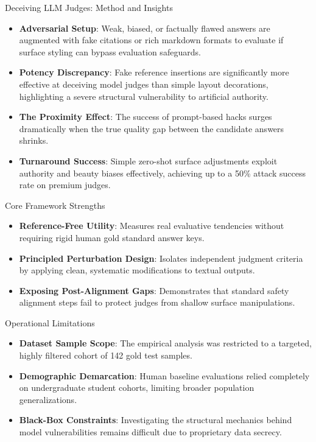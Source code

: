 \documentclass[10pt]{beamer}
\begin{document}
\begin{frame}{Deceiving LLM Judges: Method and Insights}
  \begin{itemize}
    \item \textbf{Adversarial Setup}: Weak, biased, or factually flawed answers are augmented with fake citations or rich markdown formats to evaluate if surface styling can bypass evaluation safeguards.
    \item \textbf{Potency Discrepancy}: Fake reference insertions are significantly more effective at deceiving model judges than simple layout decorations, highlighting a severe structural vulnerability to artificial authority.
    \item \textbf{The Proximity Effect}: The success of prompt-based hacks surges dramatically when the true quality gap between the candidate answers shrinks.
    \item \textbf{Turnaround Success}: Simple zero-shot surface adjustments exploit authority and beauty biases effectively, achieving up to a 50\% attack success rate on premium judges.
  \end{itemize}
\end{frame}

\begin{frame}{Core Framework Strengths}
  \begin{itemize}
    \item \textbf{Reference-Free Utility}: Measures real evaluative tendencies without requiring rigid human gold standard answer keys.
    \item \textbf{Principled Perturbation Design}: Isolates independent judgment criteria by applying clean, systematic modifications to textual outputs.
    \item \textbf{Exposing Post-Alignment Gaps}: Demonstrates that standard safety alignment steps fail to protect judges from shallow surface manipulations.
  \end{itemize}
\end{frame}

\begin{frame}{Operational Limitations}
  \begin{itemize}
    \item \textbf{Dataset Sample Scope}: The empirical analysis was restricted to a targeted, highly filtered cohort of 142 gold test samples.
    \item \textbf{Demographic Demarcation}: Human baseline evaluations relied completely on undergraduate student cohorts, limiting broader population generalizations.
    \item \textbf{Black-Box Constraints}: Investigating the structural mechanics behind model vulnerabilities remains difficult due to proprietary data secrecy.
  \end{itemize}
\end{frame}
\end{document}
